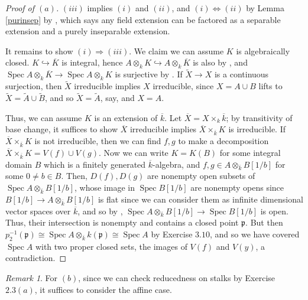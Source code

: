 \documentclass[10pt]{article}
\theoremstyle{definition}
\theoremstyle{remark}
\newtheorem*{remark}{Remark}
\numberwithin{equation}{section}
\numberwithin{figure}{subsubsection}
\DeclareMathOperator{\Spec}{Spec}
\begin{document}
\begin{proof}[Proof of $(a)$]
  $(iii)$ implies $(i)$ and $(ii)$, and $(i) \Leftrightarrow (ii)$ by Lemma \ref{purinsep} by \cite[Thm.~19.14]{Isa09}, which says any field extension can be factored as a separable extension and a purely inseparable extension.
  \par It remains to show $(i) \Rightarrow (iii)$. We claim we can assume $K$ is algebraically closed. $K \hookrightarrow \overline{K}$ is integral, hence $A \otimes_k K \hookrightarrow A \otimes_k \overline{K}$ is also by \cite[Exc.~5.3]{AM69}, and $\Spec A \otimes_k \overline{K} \to \Spec A \otimes_k K$ is surjective by \cite[Exc.\ 5.10]{AM69}. If $\tilde{X} \to X$ is a continuous surjection, then $\tilde{X}$ irreducible implies $X$ irreducible, since $X = A \cup B$ lifts to $\tilde{X} = \tilde{A} \cup \tilde{B}$, and so $\tilde{X} = \tilde{A}$, say, and $X = A$.
  \par Thus, we can assume $K$ is an extension of $\overline{k}$. Let $\overline{X} = X \times_{k} \overline{k}$; by transitivity of base change, it suffices to show $\overline{X}$ irreducible implies $\overline{X} \times_{\overline{k}} K$ is irreducible. If $\overline{X} \times_{\overline{k}} K$ is not irreducible, then we can find $f,g$ to make a decomposition $\overline{X} \times_{\overline{k}} K = V(f) \cup V(g)$. Now we can write $K = K(B)$ for some integral domain $B$ which is a finitely generated $\overline{k}$-algebra, and $f,g \in A \otimes_{\overline{k}} B[1/b]$ for some $0 \ne b \in B$. Then, $D(f),D(g)$ are nonempty open subsets of $\Spec A \otimes_{\overline{k}} B[1/b]$, whose image in $\Spec B[1/b]$ are nonempty opens since $B[1/b] \to A \otimes_{\overline{k}} B[1/b]$ is flat since we can consider them as infinite dimensional vector spaces over $\overline{k}$, and so by \cite[Exc.~7.25]{AM69}, $\Spec A \otimes_{\overline{k}} B[1/b] \to \Spec B[1/b]$ is open. Thus, their intersection is nonempty and contains a closed point $\mathfrak{p}$. But then $p_2^{-1}(\mathfrak{p}) \cong \Spec A \otimes_{\overline{k}} k(\mathfrak{p}) \cong \Spec A$ by Exercise $3.10$, and so we have covered $\Spec A$ with two proper closed sets, the images of $V(f)$ and $V(y)$, a contradiction.
\end{proof}
\begin{remark}
  For $(b)$, since we can check reducedness on stalks by Exercise $2.3(a)$, it suffices to consider the affine case.
\end{remark}
\end{document}
